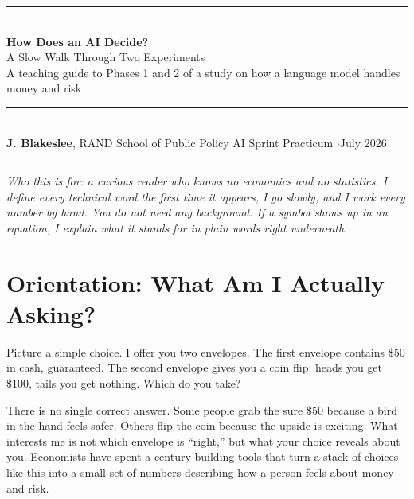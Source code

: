 \documentclass[11pt]{article}
\begin{document}
\begin{flushleft}
{\color{rulegray}\rule{\linewidth}{1.2pt}}\\[10pt]
{\LARGE\bfseries\color{ink} How Does an AI Decide?}\\[5pt]
{\Large\color{ink} A Slow Walk Through Two Experiments}\\[8pt]
{\large\color{mossdk} A teaching guide to Phases 1 and 2 of a study on how a language model handles money and risk}\\[11pt]
{\color{rulegray}\rule{\linewidth}{0.8pt}}\\[7pt]
{\small\color{ink}\textbf{J. Blakeslee}, RAND School of Public Policy \hfill
 AI Sprint Practicum \quad$\cdot$\quad July 2026}\\[3pt]
{\color{rulegray}\rule{\linewidth}{1.2pt}}
\end{flushleft}

\vspace{4pt}

\begin{tcolorbox}[
  colframe=moss, colback=mossbg, boxrule=0.5pt, sharp corners,
  left=12pt, right=12pt, top=9pt, bottom=9pt, before skip=2pt, after skip=12pt]
{\itshape\color{ink} Who this is for: a curious reader who knows no economics and no
statistics. I define every technical word the first time it appears, I go slowly, and I work
every number by hand. You do not need any background. If a symbol shows up in an equation, I explain
what it stands for in plain words right underneath.}
\end{tcolorbox}

\section{Orientation: What Am I Actually Asking?}

Picture a simple choice. I offer you two envelopes. The first envelope contains \$50 in cash,
guaranteed. The second envelope gives you a coin flip: heads you get \$100, tails you get nothing.
Which do you take?

There is no single correct answer. Some people grab the sure \$50 because a bird in the hand feels
safer. Others flip the coin because the upside is exciting. What interests me is not which envelope is
``right,'' but what your choice reveals about you. Economists have spent a century building tools that
turn a stack of choices like this into a small set of numbers describing how a person feels about
money and risk.
\end{document}
